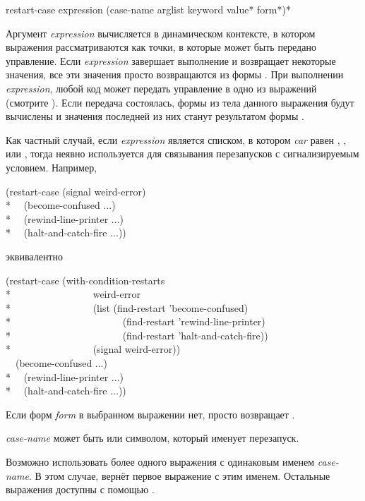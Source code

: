 \begin{defmac}
restart-case expression {(case-name arglist
                         {keyword value}*
                         {form}*)}*

Аргумент \emph{expression} вычисляется в динамическом контексте, в котором
выражения рассматриваются как точки, в которые может быть передано
управление. Если \emph{expression} завершает выполнение и возвращает некоторые
значения, все эти значения просто возвращаются из формы . При
выполнении \emph{expression}, любой код может передать управление в одно из
выражений (смотрите ). Если передача состоялась, формы из
тела данного выражения будут вычислены и значения последней из них станут
результатом формы .

Как частный случай, если \emph{expression} является списком, в котором
\emph{car} равен , ,  или , тогда
 неявно используется для связывания перезапусков с
сигнализируемым условием. Например,
\begin{lisp}
(restart-case (signal weird-error) \\*
~~(become-confused ...) \\*
~~(rewind-line-printer ...) \\*
~~(halt-and-catch-fire ...))
\end{lisp}
эквивалентно
\begin{lisp}
(restart-case (with-condition-restarts \\*
~~~~~~~~~~~~~~~~weird-error  \\*
~~~~~~~~~~~~~~~~(list (find-restart 'become-confused)  \\*
~~~~~~~~~~~~~~~~~~~~~~(find-restart 'rewind-line-printer) \\*
~~~~~~~~~~~~~~~~~~~~~~(find-restart 'halt-and-catch-fire)) \\*
~~~~~~~~~~~~~~~~(signal weird-error)) \\
~~(become-confused ...) \\*
~~(rewind-line-printer ...) \\*
~~(halt-and-catch-fire ...))
\end{lisp}

Если форм \emph{form} в выбранном выражении нет,  просто
возвращает .

\emph{case-name} может быть  или символом, который именует перезапуск.

Возможно использовать более одного выражения с одинаковым именем
\emph{case-name}. В этом случае,  вернёт первое выражение с
этим именем. Остальные выражения доступны с помощью .


\end{defmac}
